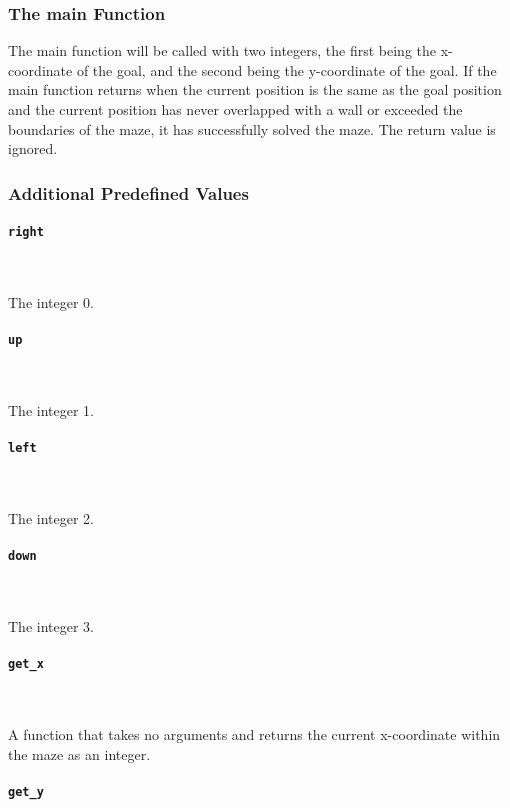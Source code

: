 \subsubsection{The main Function}

The main function will be called with two integers, the first being the x-coordinate of the goal, and the second being the y-coordinate of the goal. If the main function returns when the current position is the same as the goal position and the current position has never overlapped with a wall or exceeded the boundaries of the maze, it has successfully solved the maze. The return value is ignored.

\subsubsection{Additional Predefined Values}

\paragraph{\texttt{right}} \

The integer 0.

\paragraph{\texttt{up}} \

The integer 1.

\paragraph{\texttt{left}} \

The integer 2.

\paragraph{\texttt{down}} \

The integer 3.

\paragraph{\texttt{get\_x}} \

A function that takes no arguments and returns the current x-coordinate within the maze as an integer.

\paragraph{\texttt{get\_y}} \

